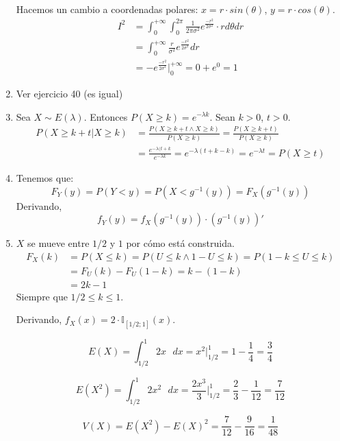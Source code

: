 \begin{enumerate}
		Hacemos un cambio a coordenadas polares: $x = r\cdot sin(\theta)$, $y = r\cdot cos(\theta)$.
		\begin{align*}
			I^2	& = \int_{0}^{+\infty} \int_{0}^{2\pi} \frac{1}{2\pi \sigma^2} e^{\frac{-r^2}{2\sigma^2}}\cdot r d\theta dr	\\
				& = \int_{0}^{+\infty} \frac{r}{\sigma^2} e^{\frac{-r^2}{2\sigma^2}} dr										\\
				& =  -e^{\frac{-r^2}{2\sigma^2}}\Big|_{0}^{+\infty} = 0 + e^0 = 1
		\end{align*}
	\item
		Ver ejercicio 40 (es igual)
	\item
		Sea $X\sim E(\lambda)$. Entonces $P(X \geq k) = e^{-\lambda k}$.
		Sean $k>0$, $t>0$.
		\begin{align*}
			P(X \geq k+t | X\geq k)	& = \frac{P(X \geq k+t \land X\geq k)}{P(X\geq k)} = \frac{P(X \geq k+t)}{P(X\geq k)}	\\
									& = \frac{e^{-\lambda (t+k}}{e^{-\lambda k}} = e^{-\lambda (t+k-k)} = e^{-\lambda t} = P(X \geq t)
		\end{align*}
	\item
		Tenemos que:
		$$F_Y(y) = P(Y < y) =  P(X < g^{-1}(y)) = F_X(g^{-1}(y))$$
		Derivando,
		$$f_Y(y) = f_X(g^{-1}(y))\cdot (g^{-1}(y))'$$

	\item
		$X$ se mueve entre $1/2$ y $1$ por cómo está construida.
		\begin{align*}
			F_X(k)	& = P(X \leq k) = P(U\leq k \land 1-U\leq k) = P(1-k \leq U \leq k)	\\
					& = F_U(k) - F_U(1-k) = k - (1-k)									\\
					& = 2k - 1
		\end{align*}
		Siempre que $1/2\leq k\leq 1$.
		
		Derivando, $f_X(x) = 2\cdot \mathbb{I}_{[1/2; 1]}(x)$.
		
		$$E(X) = \int_{1/2}^{1} 2x\text{ }dx = x^2\Big|_{1/2}^{1} = 1-\frac{1}{4} = \frac{3}{4}$$
		
		$$E(X^2) = \int_{1/2}^{1} 2x^2\text{ }dx = \frac{2x^3}{3}\Big|_{1/2}^{1} = \frac{2}{3} - \frac{1}{12} = \frac{7}{12}$$
		
		$$V(X) = E(X^2) - E(X)^2 = \frac{7}{12} - \frac{9}{16} = \frac{1}{48}$$
\end{enumerate}
